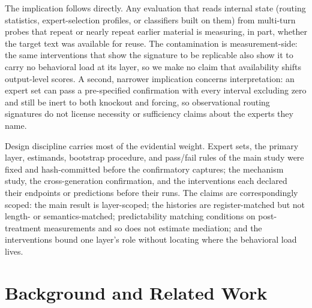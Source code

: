 \documentclass[10pt,a4paper,twocolumn]{article}
\begin{document}
The implication follows directly. Any evaluation that reads internal state
(routing statistics, expert-selection profiles, or classifiers built on
them) from multi-turn probes that repeat or nearly repeat earlier material
is measuring, in part, whether the target text was available for reuse. The
contamination is measurement-side: the same interventions that show the
signature to be replicable also show it to carry no behavioral load at its
layer, so we make no claim that availability shifts output-level scores. A
second, narrower implication concerns interpretation: an expert set can pass
a pre-specified confirmation with every interval excluding zero and still be
inert to both knockout and forcing, so observational routing signatures do
not license necessity or sufficiency claims about the experts they name.

Design discipline carries most of the evidential weight. Expert sets, the
primary layer, estimands, bootstrap procedure, and pass/fail rules of the main
study were fixed and hash-committed before the confirmatory captures; the
mechanism study, the cross-generation confirmation, and the interventions each
declared their endpoints or predictions before their runs. The claims are
correspondingly scoped: the main result is layer-scoped; the histories are
register-matched but not length- or semantics-matched; predictability matching
conditions on post-treatment measurements and so does not estimate mediation;
and the interventions bound one layer's role without locating where the
behavioral load lives.

\section{Background and Related Work}
\end{document}
